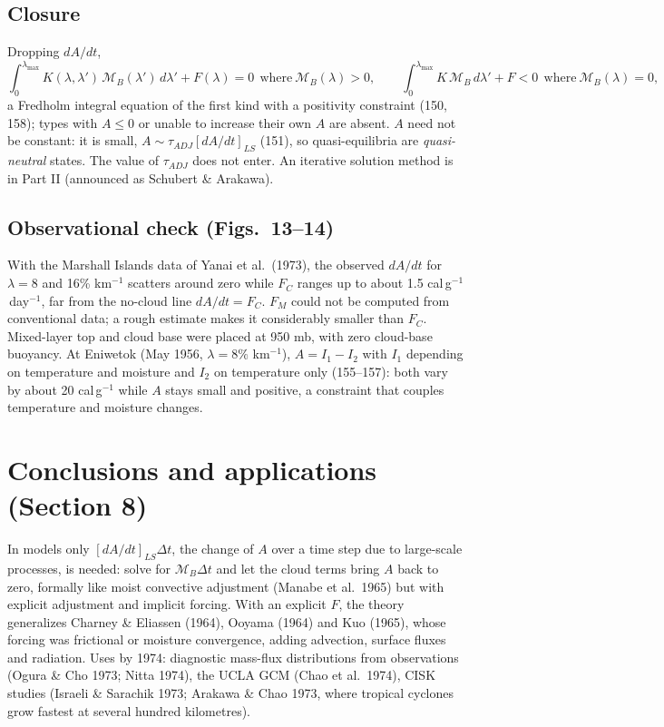 \documentclass[10pt,a4paper]{article}
\newcommand{\MB}{\mathcal M_B}
\begin{document}
\subsection{Closure} Dropping $dA/dt$,
\[
\int_0^{\lambda_{\max}}K(\lambda,\lambda')\,\MB(\lambda')\,d\lambda'+F(\lambda)=0\ \ \text{where}\ \MB(\lambda)>0,\qquad \int_0^{\lambda_{\max}}K\,\MB\,d\lambda'+F<0\ \ \text{where}\ \MB(\lambda)=0,
\]
a Fredholm integral equation of the first kind with a positivity constraint (150, 158); types with $A\leq0$ or unable to increase their own $A$ are absent. $A$ need not be constant: it is small, $A\sim\tau_{ADJ}[dA/dt]_{LS}$ (151), so quasi-equilibria are \emph{quasi-neutral} states. The value of $\tau_{ADJ}$ does not enter. An iterative solution method is in Part II (announced as Schubert \& Arakawa).

\subsection{Observational check (Figs.\ 13--14)} With the Marshall Islands data of Yanai et al.\ (1973), the observed $dA/dt$ for $\lambda=8$ and 16\% km$^{-1}$ scatters around zero while $F_C$ ranges up to about 1.5 cal\,g$^{-1}$\,day$^{-1}$, far from the no-cloud line $dA/dt=F_C$. $F_M$ could not be computed from conventional data; a rough estimate makes it considerably smaller than $F_C$. Mixed-layer top and cloud base were placed at 950 mb, with zero cloud-base buoyancy. At Eniwetok (May 1956, $\lambda=8\%$ km$^{-1}$), $A=I_1-I_2$ with $I_1$ depending on temperature and moisture and $I_2$ on temperature only (155--157): both vary by about 20 cal\,g$^{-1}$ while $A$ stays small and positive, a constraint that couples temperature and moisture changes.

\section{Conclusions and applications (Section 8)}
In models only $[dA/dt]_{LS}\Delta t$, the change of $A$ over a time step due to large-scale processes, is needed: solve for $\MB\Delta t$ and let the cloud terms bring $A$ back to zero, formally like moist convective adjustment (Manabe et al.\ 1965) but with explicit adjustment and implicit forcing. With an explicit $F$, the theory generalizes Charney \& Eliassen (1964), Ooyama (1964) and Kuo (1965), whose forcing was frictional or moisture convergence, adding advection, surface fluxes and radiation. Uses by 1974: diagnostic mass-flux distributions from observations (Ogura \& Cho 1973; Nitta 1974), the UCLA GCM (Chao et al.\ 1974), CISK studies (Israeli \& Sarachik 1973; Arakawa \& Chao 1973, where tropical cyclones grow fastest at several hundred kilometres).
\end{document}
